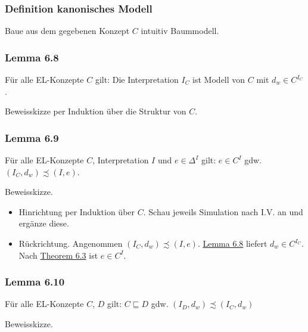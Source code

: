\subsubsection{Definition kanonisches
Modell}\label{definition-kanonisches-modell}

Baue aus dem gegebenen Konzept $C$ intuitiv Baummodell.

\hypertarget{lemma-6.8}{\subsubsection{Lemma 6.8}\label{lemma-6.8}}

Für alle EL-Konzepte $C$ gilt: Die Interpretation $I_{C}$ ist Modell
von $C$ mit $d_{w} \in C^{I_{C}}$.

Beweisskizze per Induktion über die Struktur von $C$.

\hypertarget{lemma-6.9}{\subsubsection{Lemma 6.9}\label{lemma-6.9}}

Für alle EL-Konzepte $C$, Interpretation $I$ und
$e \in \Delta^{I}$ gilt: $e \in C^{I}$ gdw.
$\left( I_{C},d_{w} \right) \precsim \left( I,e \right)$.

Beweisskizze.

\begin{itemize}
\item
  Hinrichtung per Induktion über $C$. Schau jeweils Simulation nach
  I.V. an und ergänze diese.
\item
  Rückrichtung. Angenommen
  $\left( I_{C},d_{w} \right) \precsim \left( I,e \right)$.
  \protect\hyperlink{lemma-6.8}{Lemma 6.8} liefert
  $d_{w} \in C^{I_{C}}$. Nach \protect\hyperlink{lemma-6.3}{Theorem
  6.3} ist $e \in C^{I}$.
\end{itemize}

\subsubsection{Lemma 6.10}\label{lemma-6.10}

Für alle EL-Konzepte $C$, $D$ gilt: $C \sqsubseteq D$ gdw.
$\left( I_{D},d_{w} \right) \precsim \left( I_{C},d_{w} \right)$

Beweisskizze.

